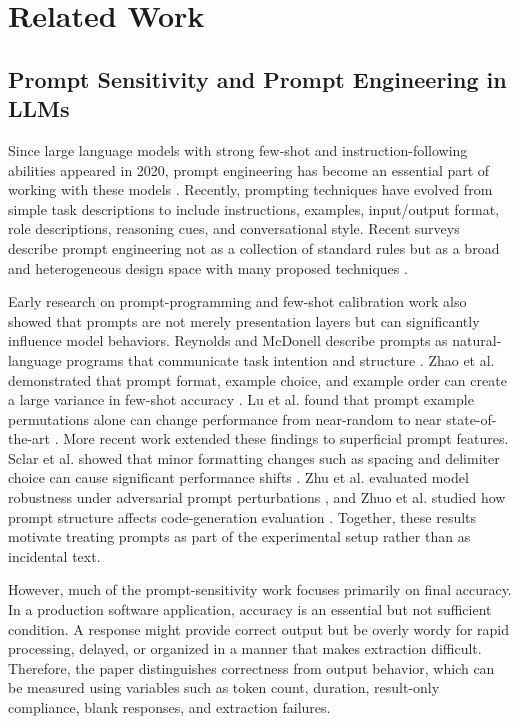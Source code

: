 \documentclass{llncs}
\begin{document}
\section{Related Work}\label{sec:relatedwork}

\subsection{Prompt Sensitivity and Prompt Engineering in
LLMs}\label{prompt-sensitivity-and-prompt-engineering-in-llms}

Since large language models with strong few-shot and instruction-following abilities appeared in 2020, prompt engineering has become an essential part of working with these models \citep{brown2020fewshot}. Recently, prompting techniques have evolved from simple task descriptions to include instructions, examples, input/output format, role descriptions, reasoning cues, and conversational style. Recent surveys describe prompt engineering not as a collection of standard rules but as a broad and heterogeneous design space with many proposed techniques \citep{schulhoff2024promptreport}.

Early research on prompt-programming and few-shot calibration work also showed that prompts are not merely presentation layers but can significantly influence model behaviors. Reynolds and McDonell describe prompts as natural-language programs that communicate task intention and structure \citep{reynolds2021promptprogramming}. Zhao et al. demonstrated that prompt format, example choice, and example order can create a large variance in few-shot accuracy \citep{zhao2021calibrate}. Lu et al. found that prompt example permutations alone can change performance from near-random to near state-of-the-art \citep{lu2021fantastically}. More recent work extended these findings to superficial prompt features. Sclar et al. showed that minor formatting changes such as spacing and delimiter choice can cause significant performance shifts \citep{sclar2023spurious}. Zhu et al. evaluated model robustness under adversarial prompt perturbations \citep{zhu2023promptrobust}, and Zhuo et al. studied how prompt structure affects code-generation evaluation \citep{zhuo2024prosa}. Together, these results motivate treating prompts as part of the experimental setup rather than as incidental text.

However, much of the prompt-sensitivity work focuses primarily on final accuracy. In a production software application, accuracy is an essential but not sufficient condition. A response might provide correct output but be overly wordy for rapid processing, delayed, or organized in a manner that makes extraction difficult. Therefore, the paper distinguishes correctness from output behavior, which can be measured using variables such as token count, duration, result-only compliance, blank responses, and extraction failures.
\end{document}
